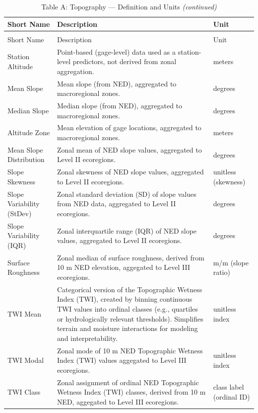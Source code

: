 \documentclass[
  10pt,
]{article}
\begin{document}
\begin{longtable}[t]{lp{8cm}l}
\caption{\label{tab:create_tables}Table A: Topography — Definition and Units}\\
\toprule
Short Name & Description & Unit\\
\midrule
\endfirsthead
\caption[]{Table A: Topography — Definition and Units \textit{(continued)}}\\
\toprule
Short Name & Description & Unit\\
\midrule
\endhead

\endfoot
\bottomrule
\endlastfoot
Station Altitude & Point-based (gage-level) data used as a station-level predictors, not
derived from zonal aggregation. & meters\\
Mean Slope & Mean slope (from NED), aggregated to macroregional zones. & degrees\\
Median Slope & Median slope (from NED), aggregated to macroregional zones. & degrees\\
Altitude Zone & Mean elevation of gage locations, aggregated to macroregional zones. & meters\\
Mean Slope Distribution & Zonal mean of NED slope values, aggregated to Level II ecoregions. & degrees\\
\addlinespace
Slope Skewness & Zonal skewness of NED slope values, aggregated to Level II ecoregions. & unitless (skewness)\\
Slope Variability (StDev) & Zonal standard deviation (SD) of slope values from NED data,
aggregated to Level II ecoregions. & degrees\\
Slope Variability (IQR) & Zonal interquartile range (IQR) of NED slope values, aggregated to
Level II ecoregions. & degrees\\
Surface Roughness & Zonal median of surface roughness, derived from 10 m NED elevation,
aggegated to Level III ecoregions. & m/m (slope ratio)\\
TWI Mean & Categorical version of the Topographic Wetness Index (TWI), created by
binning continuous TWI values into ordinal classes (e.g., quartiles or
hydrologically relevant thresholds). Simplifies terrain and moisture
interactions for modeling and interpretability. & unitless index\\
\addlinespace
TWI Modal & Zonal mode of 10 m NED Topographic Wetness Index (TWI) values
aggegated to Level III ecoregions. & unitless index\\
TWI Class & Zonal assignment of ordinal NED Topographic Wetness Index (TWI)
classes, derived from 10 m NED, aggegated to Level III ecoregions. & class label (ordinal ID)\\

\end{longtable}
\end{document}
